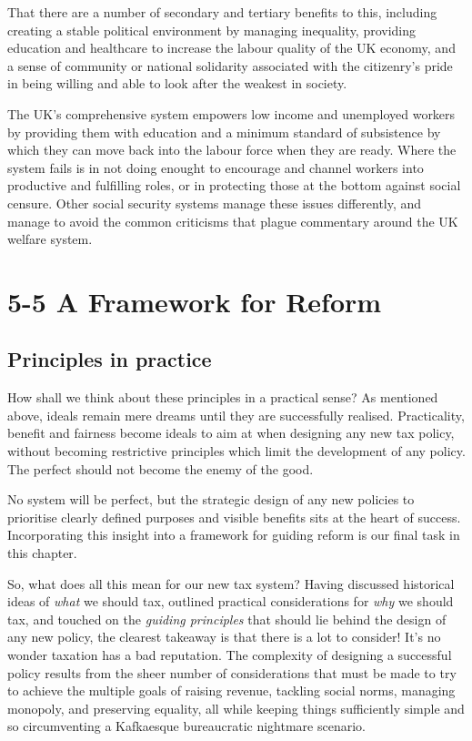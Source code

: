 \documentclass[]{tufte-handout}
\begin{document}
That there are a number of secondary and tertiary benefits to this,
including creating a stable political environment by managing
inequality, providing education and healthcare to increase the labour
quality of the UK economy, and a sense of community or national
solidarity associated with the citizenry's pride in being willing and
able to look after the weakest in society.

The UK's comprehensive system empowers low income and unemployed workers
by providing them with education and a minimum standard of subsistence
by which they can move back into the labour force when they are ready.
Where the system fails is in not doing enought to encourage and channel
workers into productive and fulfilling roles, or in protecting those at
the bottom against social censure. Other social security systems manage
these issues differently, and manage to avoid the common criticisms that
plague commentary around the UK welfare system.

\hypertarget{a-framework-for-reform}{%
\section{5-5 A Framework for Reform}\label{a-framework-for-reform}}

\hypertarget{principles-in-practice}{%
\subsection{Principles in practice}\label{principles-in-practice}}

How shall we think about these principles in a practical sense? As
mentioned above, ideals remain mere dreams until they are successfully
realised. Practicality, benefit and fairness become ideals to aim at
when designing any new tax policy, without becoming restrictive
principles which limit the development of any policy. The perfect should
not become the enemy of the good.

No system will be perfect, but the strategic design of any new policies
to prioritise clearly defined purposes and visible benefits sits at the
heart of success. Incorporating this insight into a framework for
guiding reform is our final task in this chapter.

So, what does all this mean for our new tax system? Having discussed
historical ideas of \emph{what} we should tax, outlined practical
considerations for \emph{why} we should tax, and touched on the
\emph{guiding principles} that should lie behind the design of any new
policy, the clearest takeaway is that there is a lot to consider! It's
no wonder taxation has a bad reputation. The complexity of designing a
successful policy results from the sheer number of considerations that
must be made to try to achieve the multiple goals of raising revenue,
tackling social norms, managing monopoly, and preserving equality, all
while keeping things sufficiently simple and so circumventing a
Kafkaesque bureaucratic nightmare scenario.
\end{document}
